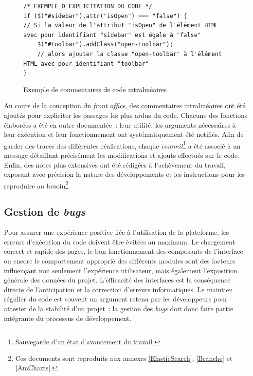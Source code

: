 \documentclass[a4paper,12pt,twoside]{book}
\newcommand{\eng}{\emph}
\newcommand{\fo}{\eng{front office}\xspace}
\begin{document}
\begin{figure}[H]
\begin{lstlisting}
/* EXEMPLE D'EXPLICITATION DU CODE */
if ($("#sidebar").attr("isOpen") === "false") {
// Si la valeur de l'attribut "isOpen" de l'élément HTML avec pour identifiant "sidebar" est égale à "false"
    $("#toolbar").addClass("open-toolbar");
    // alors ajouter la classe "open-toolbar" à l'élément HTML avec pour identifiant "toolbar"
}
\end{lstlisting}
\caption{Exemple de commentaires de code intralinéaires}
\end{figure}

Au cours de la conception du \fo, des commentaires intralinéaires ont été ajoutés pour expliciter les passages les plus ardus du code. Chacune des fonctions élaborées a été en outre documentée~: leur utilité, les arguments nécessaires à leur exécution et leur fonctionnement ont systématiquement été notifiés. Afin de garder des traces des différentes réalisations, chaque \eng{commit}\footnote{Sauvegarde d'un état d'avancement du travail.} a été associé à un message détaillant précisément les modifications et ajouts effectués sur le code. Enfin, des notes plus extensives ont été rédigées à l'achèvement du travail, exposant avec précision la nature des développements et les instructions pour les reproduire au besoin\footnote{Ces documents sont reproduits aux annexes \ref{ElasticSearch}, \ref{Branche} et \ref{AmCharts}.}.

			\subsection{Gestion de \eng{bugs}}
Pour assurer une expérience positive liée à l'utilisation de la plateforme, les erreurs d'exécution du code doivent être évitées au maximum. Le chargement correct et rapide des pages, le bon fonctionnement des composants de l'interface ou encore le comportement approprié des différents modules sont des facteurs influençant non seulement l'expérience utilisateur, mais également l'exposition générale des données du projet. L'efficacité des interfaces est la conséquence directe de l'anticipation et la correction d'erreurs informatiques. Le maintien régulier du code est souvent un argument retenu par les développeurs pour attester de la stabilité d'un projet~; la gestion des \eng{bugs} doit donc faire partie intégrante du processus de développement.
\end{document}
